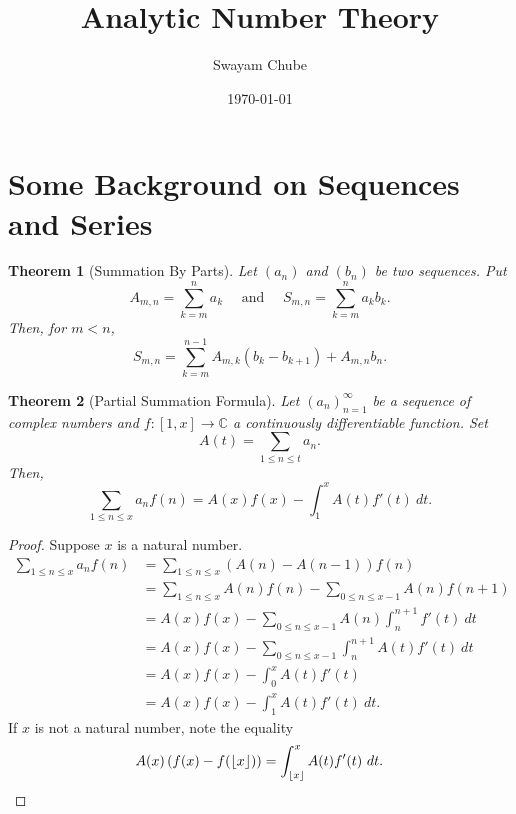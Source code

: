 \documentclass[12pt]{article}
\title{Analytic Number Theory}
\author{Swayam Chube}
\date{\today}
\theoremstyle{thmstyle}
\newtheorem{theorem}{Theorem}[section]
\theoremstyle{defstyle}
\newcommand{\bbC}{\mathbb{C}}
\renewcommand{\le}{\leqslant}
\newcommand{\floor}[1]{\left\lfloor #1\right\rfloor}
\begin{document}
\maketitle


\section{Some Background on Sequences and Series}
\begin{theorem}[Summation By Parts]
    Let $(a_n)$ and $(b_n)$ be two sequences. Put 
    \begin{equation*}
        A_{m,n} = \sum_{k = m}^n a_k\quad\text{ and }\quad S_{m,n} = \sum_{k = m}^n a_kb_k.
    \end{equation*}
    Then, for $m < n$, 
    \begin{equation*}
        S_{m,n} = \sum_{k = m}^{n - 1} A_{m,k}(b_k - b_{k + 1}) + A_{m,n}b_n.
    \end{equation*}
\end{theorem}

\begin{theorem}[Partial Summation Formula]
    Let $(a_n)_{n = 1}^\infty$ be a sequence of complex numbers and $f: [1, x]\to\bbC$ a continuously differentiable function. Set 
    \begin{equation*}
        A(t) = \sum_{1\le n\le t} a_n.
    \end{equation*}
    Then, 
    \begin{equation*}
        \sum_{1\le n\le x} a_nf(n) = A(x)f(x) - \int_1^x A(t)f'(t)~dt.
    \end{equation*}
\end{theorem}
\begin{proof}
    Suppose $x$ is a natural number. 
    \begin{align*}
        \sum_{1\le n\le x} a_nf(n) &= \sum_{1\le n\le x}\left(A(n) - A(n - 1)\right)f(n)\\
        &= \sum_{1\le n\le x} A(n)f(n) - \sum_{0\le n\le x - 1} A(n)f(n + 1)\\
        &= A(x)f(x) - \sum_{0\le n\le x - 1} A(n)\int_{n}^{n + 1}f'(t)~dt\\
        &= A(x)f(x) - \sum_{0\le n\le x - 1} \int_n^{n + 1} A(t)f'(t)~dt\\
        &= A(x)f(x) - \int_0^x A(t)f'(t)\\
        &= A(x)f(x) - \int_1^x A(t)f'(t)~dt.
    \end{align*}
    If $x$ is not a natural number, note the equality 
    \begin{equation*}
        A(x)\left(f(x) - f(\floor{x})\right) = \int_{\floor x}^x A(t)f'(t)~dt. \qedhere
    \end{equation*}
\end{proof}
\end{document}
